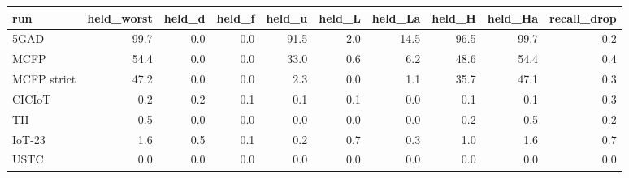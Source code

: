 \begin{tabular}{lrrrrrrrrr}
\toprule
run & held\_worst & held\_d & held\_f & held\_u & held\_L & held\_La & held\_H & held\_Ha & recall\_drop \\
\midrule
5GAD & 99.7 & 0.0 & 0.0 & 91.5 & 2.0 & 14.5 & 96.5 & 99.7 & 0.2 \\
MCFP & 54.4 & 0.0 & 0.0 & 33.0 & 0.6 & 6.2 & 48.6 & 54.4 & 0.4 \\
MCFP strict & 47.2 & 0.0 & 0.0 & 2.3 & 0.0 & 1.1 & 35.7 & 47.1 & 0.3 \\
CICIoT & 0.2 & 0.2 & 0.1 & 0.1 & 0.1 & 0.0 & 0.1 & 0.1 & 0.3 \\
TII & 0.5 & 0.0 & 0.0 & 0.0 & 0.0 & 0.0 & 0.2 & 0.5 & 0.2 \\
IoT-23 & 1.6 & 0.5 & 0.1 & 0.2 & 0.7 & 0.3 & 1.0 & 1.6 & 0.7 \\
USTC & 0.0 & 0.0 & 0.0 & 0.0 & 0.0 & 0.0 & 0.0 & 0.0 & 0.0 \\
\bottomrule
\end{tabular}
